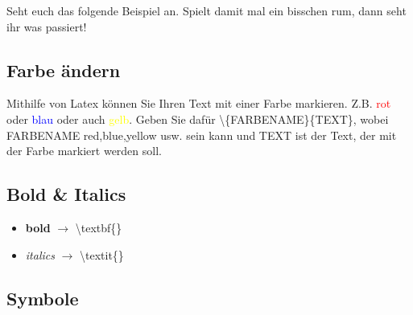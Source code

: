 \documentclass[a4paper]{scrartcl}
\begin{document}
Seht euch das folgende Beispiel an. Spielt damit mal ein bisschen rum, dann seht ihr was passiert!


\subsection*{Farbe ändern}
Mithilfe von Latex können Sie Ihren Text mit einer Farbe markieren. Z.B. \textcolor{red}{rot} oder \textcolor{blue}{blau} oder auch \textcolor{yellow}{gelb}. Geben Sie dafür \textbackslash \{FARBENAME\}\{TEXT\}, wobei FARBENAME red,blue,yellow usw. sein kann und TEXT ist der Text, der mit der Farbe markiert werden soll.

\subsection*{Bold \& Italics}
\begin{itemize}
    \item \textbf{bold} $\rightarrow$ \textbackslash textbf\{\} 
    \item \textit{italics} $\rightarrow$ \textbackslash textit\{\}
\end{itemize}

\subsection*{Symbole}
\end{document}
